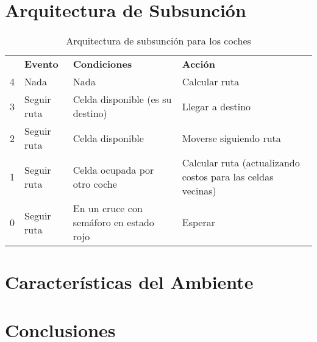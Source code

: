 \documentclass[twoside,11pt]{article}
\begin{document}
\section{Arquitectura de Subsunción}\label{sec:arch}
\begin{table}[ht]
    \centering
    \begin{tabular}{c| >{\raggedright}p{} >{\raggedright}p{} >{\raggedright\arraybackslash}p{}|}
    \cline{2-4}
      & \textbf{Evento} & \textbf{Condiciones} & \textbf{Acción} \\\cline{2-4}
     4 & Nada & Nada & Calcular ruta \\\cline{2-4}
     3 & Seguir ruta & Celda disponible (es su destino)  & Llegar a destino\\\cline{2-4}
     2 & Seguir ruta & Celda disponible & Moverse siguiendo ruta\\\cline{2-4}
     1 & Seguir ruta & Celda ocupada por otro coche & Calcular ruta (actualizando costos para las celdas vecinas)\\\cline{2-4}
     0 & Seguir ruta & En un cruce con semáforo en estado rojo & Esperar \\\cline{2-4}
    \end{tabular}
    \caption{Arquitectura de subsunción para los coches}
    \label{tab:arch}
\end{table}

\section{Características del Ambiente}
\section{Conclusiones}

\newpage



\end{document}
